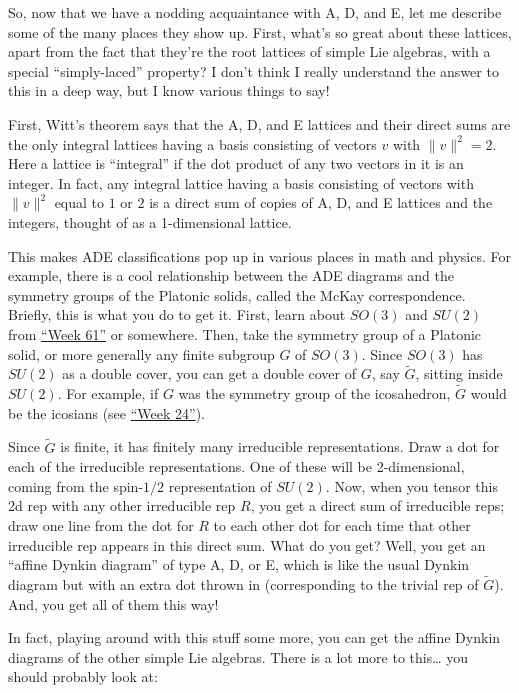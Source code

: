 \documentclass{article}
\begin{document}
So, now that we have a nodding acquaintance with A, D, and E, let me
describe some of the many places they show up. First, what's so great
about these lattices, apart from the fact that they're the root lattices
of simple Lie algebras, with a special ``simply-laced'' property? I
don't think I really understand the answer to this in a deep way, but I
know various things to say!

First, Witt's theorem says that the A, D, and E lattices and their
direct sums are the only integral lattices having a basis consisting of
vectors \(v\) with \(\|v\|^2 = 2\). Here a lattice is ``integral'' if
the dot product of any two vectors in it is an integer. In fact, any
integral lattice having a basis consisting of vectors with \(\|v\|^2\)
equal to \(1\) or \(2\) is a direct sum of copies of A, D, and E
lattices and the integers, thought of as a 1-dimensional lattice.

This makes ADE classifications pop up in various places in math and
physics. For example, there is a cool relationship between the ADE
diagrams and the symmetry groups of the Platonic solids, called the
McKay correspondence. Briefly, this is what you do to get it. First,
learn about \(SO(3)\) and \(SU(2)\) from
\protect\hyperlink{week61}{``Week 61''} or somewhere. Then, take the
symmetry group of a Platonic solid, or more generally any finite
subgroup \(G\) of \(SO(3)\). Since \(SO(3)\) has \(SU(2)\) as a double
cover, you can get a double cover of \(G\), say \(\widetilde{G}\),
sitting inside \(SU(2)\). For example, if \(G\) was the symmetry group
of the icosahedron, \(\widetilde{G}\) would be the icosians (see
\protect\hyperlink{week24}{``Week 24''}).

Since \(\widetilde{G}\) is finite, it has finitely many irreducible
representations. Draw a dot for each of the irreducible representations.
One of these will be 2-dimensional, coming from the spin-\(1/2\)
representation of \(SU(2)\). Now, when you tensor this 2d rep with any
other irreducible rep \(R\), you get a direct sum of irreducible reps;
draw one line from the dot for \(R\) to each other dot for each time
that other irreducible rep appears in this direct sum. What do you get?
Well, you get an ``affine Dynkin diagram'' of type A, D, or E, which is
like the usual Dynkin diagram but with an extra dot thrown in
(corresponding to the trivial rep of \(\widetilde{G}\)). And, you get
all of them this way!

In fact, playing around with this stuff some more, you can get the
affine Dynkin diagrams of the other simple Lie algebras. There is a lot
more to this\ldots{} you should probably look at:
\end{document}
